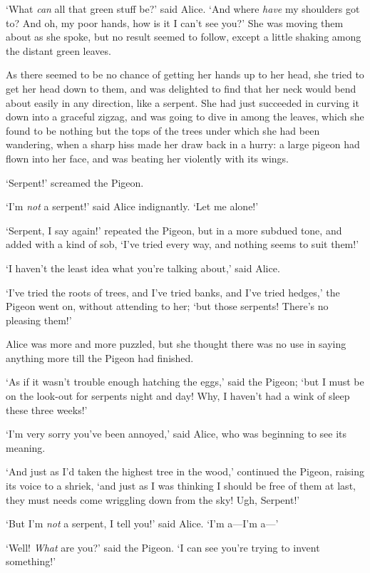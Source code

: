 \documentclass[12pt,openany]{memoir}
\begin{document}
`What \textit{can} all that green stuff be?' said Alice. `And where \textit{have} my shoulders got to? And oh, my poor hands, how is it I can't see you?' She was moving them about as she spoke, but no result seemed to follow, except a little shaking among the distant green leaves.

As there seemed to be no chance of getting her hands up to her head, she tried to get her head down to them, and was delighted to find that her neck would bend about easily in any direction, like a serpent. She had just succeeded in curving it down into a graceful zigzag, and was going to dive in among the leaves, which she found to be nothing but the tops of the trees under which she had been wandering, when a sharp hiss made her draw back in a hurry: a large pigeon had flown into her face, and was beating her violently with its wings.

`Serpent!' screamed the Pigeon.

`I'm \textit{not} a serpent!' said Alice indignantly. `Let me alone!'

`Serpent, I say again!' repeated the Pigeon, but in a more subdued tone, and added with a kind of sob, `I've tried every way, and nothing seems to suit them!'

`I haven't the least idea what you're talking about,' said Alice.

`I've tried the roots of trees, and I've tried banks, and I've tried hedges,' the Pigeon went on, without attending to her; `but those serpents! There's no pleasing them!'

Alice was more and more puzzled, but she thought there was no use in saying anything more till the Pigeon had finished.

`As if it wasn't trouble enough hatching the eggs,' said the Pigeon; `but I must be on the look-out for serpents night and day! Why, I haven't had a wink of sleep these three weeks!'

`I'm very sorry you've been annoyed,' said Alice, who was beginning to see its meaning.

`And just as I'd taken the highest tree in the wood,' continued the Pigeon, raising its voice to a shriek, `and just as I was thinking I should be free of them at last, they must needs come wriggling down from the sky! Ugh, Serpent!'

`But I'm \textit{not} a serpent, I tell you!' said Alice. `I'm a---I'm a---'

`Well! \textit{What} are you?' said the Pigeon. `I can see you're trying to invent something!'
\end{document}
